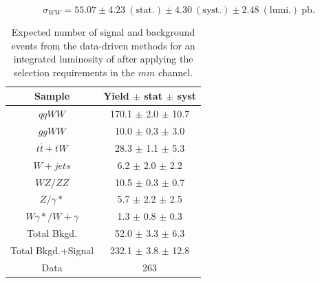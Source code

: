 \begin{equation*}
\sigma_{WW}  = 55.07 \pm 4.23~\mathrm{(stat.)} \pm 4.30~\mathrm{(syst.)} \pm 2.48~\mathrm{(lumi.)~pb}.
\end{equation*}

\begin{table}[ht!]
  \begin{center}
  \begin{tabular} {|c|c|}
\hline
Sample                & Yield $\pm$ stat $\pm$ syst \\ \hline \hline
$qqWW$                & 170.1 $\pm$  2.0 $\pm$ 10.7  \\ \hline
$ggWW$                & 10.0 $\pm$  0.3 $\pm$  3.0  \\ \hline
$t\bar{t} + tW$      & 28.3 $\pm$  1.1 $\pm$  5.3  \\ \hline
$W+jets$              &  6.2 $\pm$  2.0 $\pm$  2.2  \\ \hline
$WZ$/$ZZ$             & 10.5 $\pm$  0.3 $\pm$  0.7  \\ \hline
$Z/\gamma*$          &  5.7 $\pm$  2.2 $\pm$  2.5  \\ \hline
$W\gamma*/W+\gamma$ &  1.3 $\pm$  0.8 $\pm$  0.3  \\ \hline \hline
Total Bkgd.           & 52.0 $\pm$  3.3 $\pm$  6.3  \\ \hline \hline
Total Bkgd.+Signal    & 232.1 $\pm$  3.8 $\pm$ 12.8  \\ \hline \hline
Data                  & 263 \\ \hline
\end{tabular}
  \caption{Expected number of signal and background events from the data-driven methods for
  an integrated luminosity of \intlumi after applying the selection requirements in the $mm$ channel.}
   \label{tab:data_yields_mm}
  \end{center}
\end{table}

